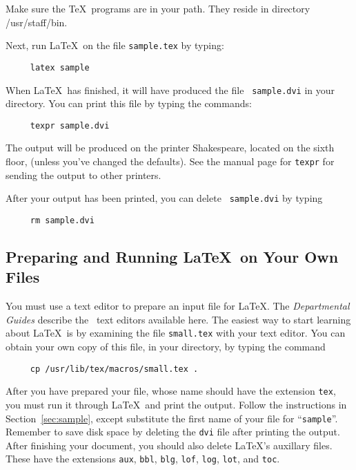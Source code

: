 Make sure the \TeX\ programs are in your path. They reside
in directory /usr/staff/bin.

Next, run \LaTeX\ on the file \mbox{\tt sample.tex} by typing:
\begin{verbatim}
     latex sample
\end{verbatim}
When \LaTeX\ has finished, it will have produced the file \mbox{\tt
sample.dvi} in your directory.  You can print this file by typing
the commands:
\begin{verbatim}
     texpr sample.dvi
\end{verbatim}
The output will be produced on the printer Shakespeare, located on the
sixth floor, (unless you've changed the defaults).
See the manual page for \verb|texpr| for sending the
output to other printers.

After your output has been printed, you can delete \mbox{\tt
sample.dvi} by typing
\begin{verbatim}
     rm sample.dvi
\end{verbatim}

\subsection{Preparing and Running \LaTeX\ on Your Own Files}

You must use a text editor to prepare an input file for \LaTeX.
The {\em Departmental Guides} describe the \UNIX\ text editors available
here.  The easiest way to start learning about \LaTeX\ is by 
examining the file \mbox{\tt small.tex} with your text editor.
You can obtain your own copy of this file, in your directory,
by typing the command
\begin{verbatim}
     cp /usr/lib/tex/macros/small.tex .
\end{verbatim}

After you have prepared your file, whose name should have the extension
{\tt tex}, you must run it through \LaTeX\ and print the output.
Follow the instructions in Section~\ref{sec:sample}, except substitute
the first name of your file for ``\mbox{\tt sample}''.  Remember to
save disk space by deleting the {\tt dvi} file after printing the
output.
After finishing your document, you should also delete \LaTeX's auxillary files.
These have the extensions {\tt aux}, {\tt bbl}, {\tt blg}, {\tt lof},
{\tt log}, {\tt lot}, and {\tt toc}.


